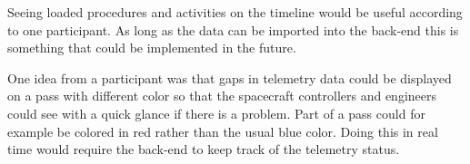 Seeing loaded procedures and activities on the timeline would be useful according to one participant. As long as the data can be imported into the back-end this is something that could be implemented in the future.

One idea from a participant was that gaps in telemetry data could be displayed on a pass with different color so that the spacecraft controllers and engineers could see with a quick glance if there is a problem. Part of a pass could for example be colored in red rather than the usual blue color. Doing this in real time would require the back-end to keep track of the telemetry status.